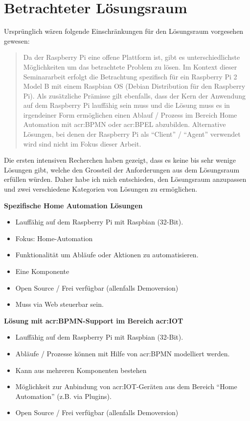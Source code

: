 \section{Betrachteter Lösungsraum}
Ursprünglich wären folgende Einschränkungen für den Lösungsraum vorgesehen gewesen:
\blockquote {Da der Raspberry Pi eine offene Plattform ist, gibt es unterschiedlichste Möglichkeiten um das betrachtete Problem zu lösen. Im Kontext dieser Seminararbeit erfolgt die Betrachtung spezifisch für ein Raspberry Pi 2 Model B mit einem Raspbian OS (Debian Distribution für den Raspberry Pi). Als zusätzliche Prämisse gilt ebenfalls, dass der Kern der Anwendung auf dem Raspberry Pi lauffähig sein muss und die Lösung muss es in irgendeiner Form ermöglichen einen Ablauf / Prozess im Bereich Home Automation mit \gls{acr:BPMN} oder \gls{acr:BPEL} abzubilden. Alternative Lösungen, bei denen der Raspberry Pi als "`Client"' / "`Agent"' verwendet wird sind nicht im Fokus dieser Arbeit.}

Die ersten intensiven Recherchen haben gezeigt, dass es keine bis sehr wenige Lösungen gibt, welche den Grossteil der Anforderungen aus dem Lösungsraum erfüllen würden. Daher habe ich mich entschieden, den Lösungsraum anzupassen und zwei verschiedene Kategorien von Lösungen zu ermöglichen.

\textbf{Spezifische Home Automation Lösungen}
\begin{itemize}
\item Lauffähig auf dem Raspberry Pi mit Raspbian (32-Bit).
\item Fokus: Home-Automation
\item Funktionalität um Abläufe oder Aktionen zu automatisieren.
\item Eine Komponente
\item Open Source / Frei verfügbar (allenfalls Demoversion)
\item Muss via Web steuerbar sein.
\end{itemize}

\textbf{Lösung mit \gls{acr:BPMN}-Support im Bereich \gls{acr:IOT}}
\begin{itemize}
\item Lauffähig auf dem Raspberry Pi mit Raspbian (32-Bit).
\item Abläufe / Prozesse können mit Hilfe von \gls{acr:BPMN} modelliert werden.
\item Kann aus mehreren Komponenten bestehen
\item Möglichkeit zur Anbindung von \gls{acr:IOT}-Geräten aus dem Bereich "`Home Automation"' (z.B. via Plugins).
\item Open Source / Frei verfügbar (allenfalls Demoversion)
\end{itemize}


